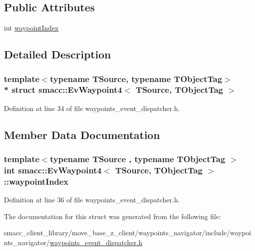 \subsection*{Public Attributes}
\begin{DoxyCompactItemize}
\item 
int \hyperlink{structsmacc_1_1EvWaypoint4_ac943492ea5681667dc5b9627f4428216}{waypoint\+Index}
\end{DoxyCompactItemize}


\subsection{Detailed Description}
\subsubsection*{template$<$typename T\+Source, typename T\+Object\+Tag$>$\\*
struct smacc\+::\+Ev\+Waypoint4$<$ T\+Source, T\+Object\+Tag $>$}



Definition at line 34 of file waypoints\+\_\+event\+\_\+dispatcher.\+h.



\subsection{Member Data Documentation}
\subsubsection[{\texorpdfstring{waypoint\+Index}{waypointIndex}}]{\setlength{\rightskip}{0pt plus 5cm}template$<$typename T\+Source , typename T\+Object\+Tag $>$ int {\bf smacc\+::\+Ev\+Waypoint4}$<$ T\+Source, T\+Object\+Tag $>$\+::waypoint\+Index}\hypertarget{structsmacc_1_1EvWaypoint4_ac943492ea5681667dc5b9627f4428216}{}\label{structsmacc_1_1EvWaypoint4_ac943492ea5681667dc5b9627f4428216}


Definition at line 36 of file waypoints\+\_\+event\+\_\+dispatcher.\+h.



The documentation for this struct was generated from the following file\+:\begin{DoxyCompactItemize}
\item 
smacc\+\_\+client\+\_\+library/move\+\_\+base\+\_\+z\+\_\+client/waypoints\+\_\+navigator/include/waypoints\+\_\+navigator/\hyperlink{waypoints__event__dispatcher_8h}{waypoints\+\_\+event\+\_\+dispatcher.\+h}\end{DoxyCompactItemize}
